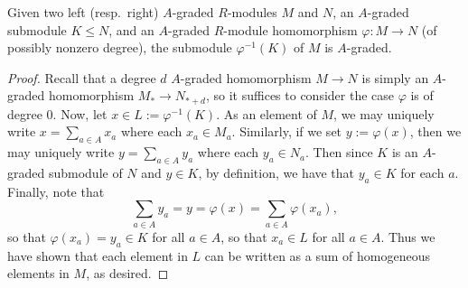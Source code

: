 \documentclass[../main.tex]{subfiles}
\begin{document}
\begin{proposition}\label{preimage_of_A_graded_is_A_graded}
	Given two left (resp.\ right) $A$-graded $R$-modules $M$ and $N$, an $A$-graded submodule $K\leq N$, and an $A$-graded $R$-module homomorphism $\varphi:M\to N$ (of possibly nonzero degree), the submodule $\varphi^{-1}(K)$ of $M$ is $A$-graded.
\end{proposition}
\begin{proof}
	Recall that a degree $d$ $A$-graded homomorphism $M\to N$ is simply an $A$-graded homomorphism $M_*\to N_{*+d}$, so it suffices to consider the case $\varphi$ is of degree $0$. Now, let $x\in L:=\varphi^{-1}(K)$. As an element of $M$, we may uniquely write $x=\sum_{a\in A}x_a$ where each $x_a\in M_a$. Similarly, if we set $y:=\varphi(x)$, then we may uniquely write $y=\sum_{a\in A}y_a$ where each $y_a\in N_a$. Then since $K$ is an $A$-graded submodule of $N$ and $y\in K$, by definition, we have that $y_a\in K$ for each $a$. Finally, note that
	\[\sum_{a\in A}y_a=y=\varphi(x)=\sum_{a\in A}\varphi(x_a),\]
	so that $\varphi(x_a)=y_a\in K$ for all $a\in A$, so that $x_a\in L$ for all $a\in A$. Thus we have shown that each element in $L$ can be written as a sum of homogeneous elements in $M$, as desired.
\end{proof}
\end{document}
